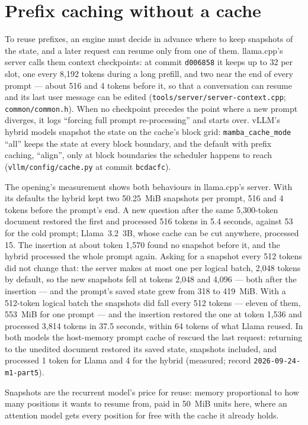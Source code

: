 \section{Prefix caching without a cache}

To reuse prefixes, an engine must decide in advance where to keep snapshots of
the state, and a later request can resume only from one of them. llama.cpp's
server calls them context checkpoints: at commit \texttt{d006858} it keeps up
to 32 per slot, one every 8,192 tokens during a long prefill, and two near the
end of every prompt --- about 516 and 4 tokens before it, so that a
conversation can resume and its last user message can be edited
(\texttt{tools/server/server-context.cpp}; \texttt{common/common.h}). When no
checkpoint precedes the point where a new prompt diverges, it logs ``forcing
full prompt re-processing'' and starts over. vLLM's hybrid models snapshot the
state on the cache's block grid: \texttt{mamba\_cache\_mode} ``all'' keeps the
state at every block boundary, and the default with prefix caching, ``align'',
only at block boundaries the scheduler happens to reach
(\texttt{vllm/config/cache.py} at commit \texttt{bcdacfc}).

The opening's measurement shows both behaviours in llama.cpp's server. With
its defaults the hybrid kept two 50.25~MiB snapshots per prompt, 516 and 4
tokens before the prompt's end. A new question after the same 5,300-token
document restored the first and processed 516 tokens in 5.4 seconds, against 53
for the cold prompt; Llama~3.2~3B, whose cache can be cut anywhere, processed
15. The insertion at about token 1,570 found no snapshot before it, and the
hybrid processed the whole prompt again. Asking for a snapshot every 512 tokens
did not change that: the server makes at most one per logical batch, 2,048
tokens by default, so the new snapshots fell at tokens 2,048 and 4,096 ---
both after the insertion --- and the prompt's saved state grew from 318 to
419~MiB. With a 512-token logical batch the snapshots did fall every 512
tokens --- eleven of them, 553~MiB for one prompt --- and the insertion restored
the one at token 1,536 and processed 3,814 tokens in 37.5 seconds, within 64
tokens of what Llama reused. In both models the host-memory prompt cache of
 rescued the last request: returning to the unedited
document restored its saved state, snapshots included, and processed 1 token
for Llama and 4 for the hybrid (measured; record
\texttt{2026-09-24-m1-part5}).

Snapshots are the recurrent model's price for reuse: memory proportional to
how many positions it wants to resume from, paid in 50~MiB units here, where
an attention model gets every position for free with the cache it already
holds.

